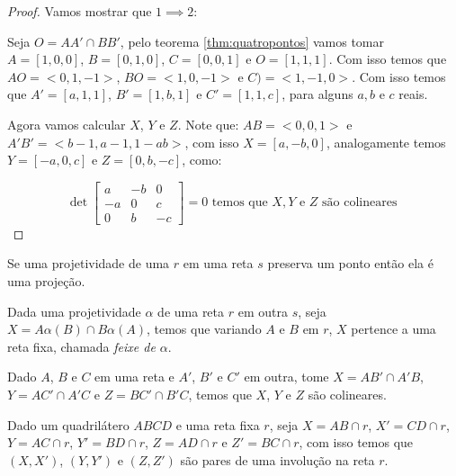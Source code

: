 \begin{proof}
Vamos mostrar que $1 \implies 2$:

Seja $O = AA' \cap BB'$, pelo teorema \ref{thm:quatropontos} vamos tomar $A = [1, 0, 0]$, $B = [0, 1, 0]$, $C = [0, 0, 1]$ e $O = [1, 1, 1]$. Com isso temos que $AO = < 0, 1, -1>$, $BO = < 1, 0, -1>$ e $C) = < 1, -1, 0>$. Com isso temos que $A' = [a,1,1]$, $B' = [1,b,1]$ e $C'= [1,1,c]$, para alguns $a,b$ e $c$ reais. 

Agora vamos calcular $X$, $Y$ e $Z$. Note que: $AB = <0,0,1>$ e $A'B' = <b-1,a-1,1-ab>$, com isso $X = [a,-b,0]$, analogamente temos $Y = [-a,0,c]$ e $Z = [0,b,-c]$, como:

\[\det \begin{bmatrix} a & -b & 0 \\ -a & 0 & c \\ 0 & b & -c \end{bmatrix} = 0 \text{ temos que } X,Y \text{ e } Z \text{ são colineares } \]
\end{proof}


\begin{lem}
Se uma projetividade de uma $r$ em uma reta $s$ preserva um ponto então ela é uma projeção.
\end{lem}

\begin{thm}
Dada uma projetividade $\alpha$ de uma reta $r$ em outra $s$, seja $X = A\alpha(B) \cap B\alpha(A)$, temos que variando $A$ e $B$ em $r$, $X$ pertence a uma reta fixa, chamada \emph{feixe de $\alpha$}.
\end{thm}

\begin{cor}
Dado $A$, $B$ e $C$ em uma reta e $A'$, $B'$ e $C'$ em outra, tome $X = AB' \cap A'B$, $Y = AC'\cap A'C$ e $Z = BC' \cap B'C$, temos que $X$, $Y$ e $Z$ são colineares.
\end{cor}


\begin{thm}
Dado um quadrilátero $ABCD$ e uma reta fixa $r$, seja $X = AB \cap r$, $X' = CD \cap r$, $Y = AC \cap r$, $Y' = BD \cap r$, $Z = AD \cap r$ e $Z' = BC \cap r$, com isso temos que $(X,X')$, $(Y,Y')$ e $(Z,Z')$ são pares de uma involução na reta $r$.
    
\end{thm}